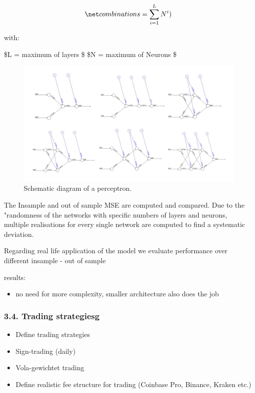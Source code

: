 \documentclass[
]{article}
\providecommand{\tightlist}{%
  \setlength{\itemsep}{0pt}\setlength{\parskip}{0pt}}
\begin{document}
\begin{align} \label{eq:complexity}
\net combinations=\sum_{i=1}^{L}N^{i})
\end{align}

with:

\$L = maximum of layers \in \N \$ \$N = maximum of Neurons \in \N \$

\begin{figure}

{\centering \includegraphics[width=1\linewidth]{images/examples for function} 

}

\caption{Schematic diagram of a perceptron.}\label{fig:examples_for_function}
\end{figure}

The Insample and out of sample MSE are computed and compared. Due to the
"randomness of the networks with specific numbers of layers and neurons,
multiple realisations for every single network are computed to find a
systematic deviation.

Regarding real life application of the model we evaluate performance
over different insample - out of sample

results:

\begin{itemize}
\tightlist
\item
  no need for more complexity, smaller architecture also does the job
\end{itemize}

\hypertarget{trading-strategiesg}{%
\subsubsection{3.4. Trading strategiesg}\label{trading-strategiesg}}

\begin{itemize}
\item
  Define trading strategies
\item
  Sign-trading (daily)
\item
  Vola-gewichtet trading
\item
  Define realistic fee structure for trading (Coinbase Pro, Binance,
  Kraken etc.)
\end{itemize}
\end{document}
